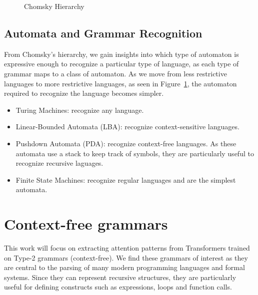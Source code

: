 \begin{figure}[h]
    \centering
    \caption{Chomsky Hierarchy}
    \label{fig:chomsky-fig}
\end{figure}

\subsection{Automata and Grammar Recognition}

From Chomsky's hierarchy, we gain insights into which type of automaton is expressive enough to recognize a particular type of language, as each type of grammar maps to a class of automaton. As we move from less restrictive languages to more restrictive languages, as seen in Figure~\ref{fig:chomsky-fig}, the automaton required to recognize the language becomes simpler.

\begin{itemize}
    \item Turing Machines: recognize any language.
    \item Linear-Bounded Automata (LBA): recognize context-sensitive languages.
    \item Pushdown Automata (PDA): recognize context-free languages. As these automata use a stack to keep track of symbols, they are particularly useful to recognize recursive laguages.
    \item Finite State Machines: recognize regular languages and are the simplest automata.
\end{itemize}

\section{Context-free grammars}
This work will focus on extracting attention patterns from Transformers trained on Type-2 grammars (context-free). We find these grammars of interest as they are central to the parsing of many modern programming languages and formal systems. Since they can represent recursive structures, they are particularly useful for defining constructs such as expressions, loops and function calls.

